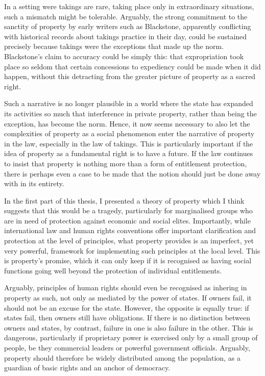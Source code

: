 In a setting were takings are rare, taking place only in extraordinary situations, such a mismatch might be tolerable. Arguably, the strong commitment to the sanctity of property by early writers such as Blackstone, apparently conflicting with historical records about takings practice in their day, could be sustained precisely because takings were the exceptions that made up the norm.  Blackstone's claim to accuracy could be simply this: that expropriation took place so seldom that  certain concessions to expediency could be made when it did happen, without this detracting from the greater picture of property as a sacred right.

Such a narrative is no longer plausible in a world where the state has expanded its activities so much that interference in private property, rather than being the exception, has become the norm. Hence, it now seems necessary to also let the complexities of property as a social phenomenon enter the narrative of property in the law, especially in the law of takings. This is particularly important if the idea of property as a fundamental right is to have a future. If the law continues to insist that property is nothing more than a form of entitlement protection, there is perhaps even a case to be made that the notion should just be done away with in its entirety.

In the first part of this thesis, I presented a theory of property which I think suggests that this would be a tragedy, particularly for marginalised groups who are in need of protection against economic and social elites. Importantly, while international law and human rights conventions offer important clarification and protection at the level of principles, what property provides is an imperfect, yet very powerful, framework for implementing such principles at the local level. This is property's promise, which it can only keep if it is recognised as having social functions going well beyond the protection of individual entitlements.

Arguably, principles of human rights should even be recognised as inhering in property as such, not only as mediated by the power of states. If owners fail, it should not be an excuse for the state. However, the opposite is equally true: if states fail, then owners still have obligations. If there is no distinction between owners and states, by contrast, failure in one is also failure in the other. This is dangerous, particularly if proprietary power is exercised only by a small group of people, be they commercial leaders or powerful government officials. Arguably, property should therefore be widely distributed among the population, as a guardian of basic rights and an anchor of democracy.
 

